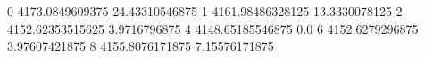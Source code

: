 0 4173.0849609375 24.43310546875
1 4161.98486328125 13.3330078125
2 4152.62353515625 3.9716796875
4 4148.65185546875 0.0
6 4152.6279296875 3.97607421875
8 4155.8076171875 7.15576171875
